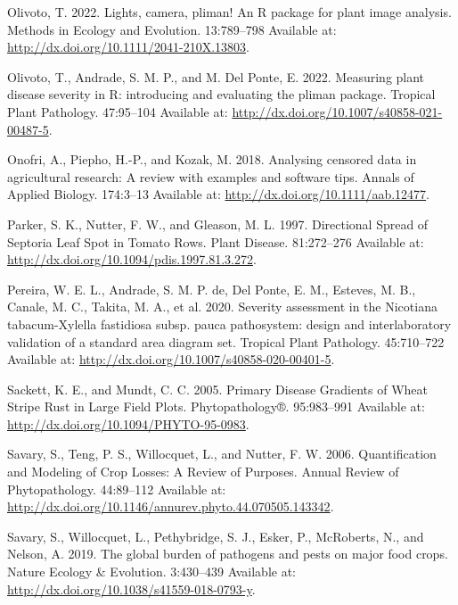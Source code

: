\documentclass[
  letterpaper,
]{book}
\newlength{\cslhangindent}
\newlength{\cslentryspacingunit} %
\newenvironment{CSLReferences}[2] %
 {%
  \setlength{\parindent}{0pt}
  \ifodd #1
  \let\oldpar\par
  \def\par{\hangindent=\cslhangindent\oldpar}
  \fi
  \setlength{\parskip}{#2\cslentryspacingunit}
 }%
 {}
\begin{document}
\begin{CSLReferences}{0}{0}
\leavevmode{}%
Olivoto, T. 2022. Lights, camera, pliman! An R package for plant image
analysis. Methods in Ecology and Evolution. 13:789--798 Available at:
\url{http://dx.doi.org/10.1111/2041-210X.13803}.

\leavevmode{}%
Olivoto, T., Andrade, S. M. P., and M. Del Ponte, E. 2022. Measuring
plant disease severity in R: introducing and evaluating the pliman
package. Tropical Plant Pathology. 47:95--104 Available at:
\url{http://dx.doi.org/10.1007/s40858-021-00487-5}.

\leavevmode{}%
Onofri, A., Piepho, H.-P., and Kozak, M. 2018. Analysing censored data
in agricultural research: A review with examples and software tips.
Annals of Applied Biology. 174:3--13 Available at:
\url{http://dx.doi.org/10.1111/aab.12477}.

\leavevmode{}%
Parker, S. K., Nutter, F. W., and Gleason, M. L. 1997. Directional
Spread of Septoria Leaf Spot in Tomato Rows. Plant Disease. 81:272--276
Available at: \url{http://dx.doi.org/10.1094/pdis.1997.81.3.272}.

\leavevmode{}%
Pereira, W. E. L., Andrade, S. M. P. de, Del Ponte, E. M., Esteves, M.
B., Canale, M. C., Takita, M. A., et al. 2020. Severity assessment in
the Nicotiana tabacum-Xylella fastidiosa subsp. pauca pathosystem:
design and interlaboratory validation of a standard area diagram set.
Tropical Plant Pathology. 45:710--722 Available at:
\url{http://dx.doi.org/10.1007/s40858-020-00401-5}.

\leavevmode{}%
Sackett, K. E., and Mundt, C. C. 2005. Primary Disease Gradients of
Wheat Stripe Rust in Large Field Plots. Phytopathology®. 95:983--991
Available at: \url{http://dx.doi.org/10.1094/PHYTO-95-0983}.

\leavevmode{}%
Savary, S., Teng, P. S., Willocquet, L., and Nutter, F. W. 2006.
Quantification and Modeling of Crop Losses: A Review of Purposes. Annual
Review of Phytopathology. 44:89--112 Available at:
\url{http://dx.doi.org/10.1146/annurev.phyto.44.070505.143342}.

\leavevmode{}%
Savary, S., Willocquet, L., Pethybridge, S. J., Esker, P., McRoberts,
N., and Nelson, A. 2019. The global burden of pathogens and pests on
major food crops. Nature Ecology \& Evolution. 3:430--439 Available at:
\url{http://dx.doi.org/10.1038/s41559-018-0793-y}.


\end{CSLReferences}
\end{document}
